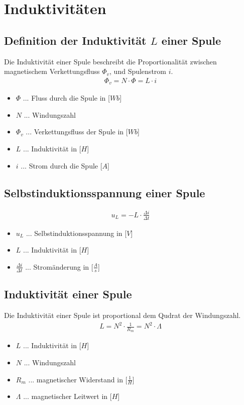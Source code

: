 \newpage

\section{Induktivitäten}
\subsection{Definition der Induktivität $L$ einer Spule}
Die Induktivität einer Spule beschreibt die Proportionalität zwischen magnetischem Verkettungsfluss $\Phi_v$, und Spulenstrom $i$.
\begin{align}
    \Phi_v=N\cdot \Phi = L \cdot i
\end{align}
\begin{itemize}
    \item $\Phi$ ... Fluss durch die Spule in [$Wb$]
    \item $N$ ... Windungszahl
    \item $\Phi_v$ ... Verkettungsfluss der Spule in [$Wb$]
    \item $L$ ... Induktivität in [$H$]
    \item $i$ ... Strom durch die Spule [$A$]
\end{itemize}

\subsection{Selbstinduktionsspannung einer Spule}
\begin{align}
    u_L = -L \cdot \frac{\Delta i}{\Delta t}
\end{align}
\begin{itemize}
    \item $u_L$ ... Selbstinduktionsspannung in [$V$]
    \item $L$ ... Induktivität in [$H$]
    \item $\frac{\Delta i}{\Delta t}$ ... Stromänderung in [$\frac{A}{s}$]
\end{itemize}

\subsection{Induktivität einer Spule}
Die Induktivität einer Spule ist proportional dem Qudrat der Windungszahl.
\begin{align}
    L=N^2\cdot \frac{1}{R_m}=N^2\cdot \Lambda
\end{align}
\begin{itemize}
    \item $L$ ... Induktivität in [$H$]
    \item $N$ ... Windungszahl
    \item $R_m$ ... magnetischer Widerstand in [$\frac{1}{H}$]
    \item $\Lambda$ ... magnetischer Leitwert in [$H$]
\end{itemize}


